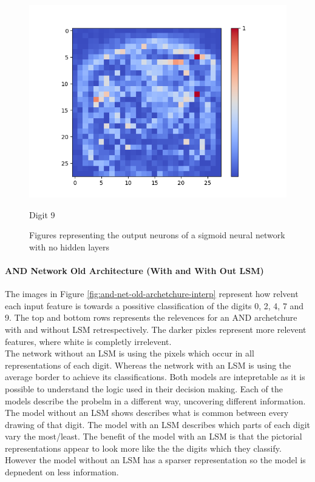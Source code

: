 \begin{figure}[H]
\begin{minipage}[b]{0.19\textwidth}
		\includegraphics[width=\textwidth]{Sigmoid(NO-Hidden)/Layer0-Neuron-9.png}
		\caption{Digit 9}
	\end{minipage}
	\hfill
	\caption{Figures representing the output neurons of a sigmoid neural network with no hidden layers}
\end{figure}


\paragraph{AND Network Old Architecture (With and With Out LSM)}
The images in Figure \ref{fig:and-net-old-archetchure-interp} represent how relvent each input feature is towards a possitive classification of the digits 0, 2, 4, 7 and 9. The top and bottom rows represents the relevences for an AND archetchure with and without LSM retrespectively. The darker pixles represent more relevent features, where white is completly irrelevent.\\

The network without an LSM is using the pixels which occur in all representations of each digit. Whereas the network with an LSM is using the average border to achieve its classifications. Both models are intepretable as it is possible to understand the logic used in their decision making. Each of the models describe the probelm in a different way, uncovering different information. The model without an LSM shows describes what is common between every drawing of that digit. The model with an LSM describes which parts of each digit vary the most/least. The benefit of the model with an LSM is that the pictorial representations appear to look more like the the digits which they classify. However the model without an LSM has a sparser representation so the model is depnedent on less information.

